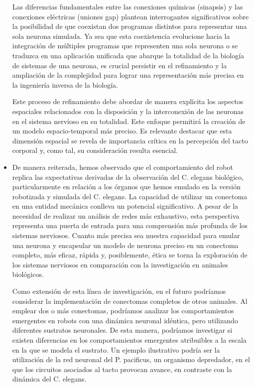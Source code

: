 \begin{itemize}
Las diferencias fundamentales entre las conexiones químicas (sinapsis) y las conexiones eléctricas (uniones gap) plantean interrogantes significativos sobre la posibilidad de que coexistan dos programas distintos para representar una sola neurona simulada. Ya sea que esta coexistencia evolucione hacia la integración de múltiples programas que representen una sola neurona o se traduzca en una aplicación unificada que abarque la totalidad de la biología de sistemas de una neurona, es crucial persistir en el refinamiento y la ampliación de la complejidad para lograr una representación más precisa en la ingeniería inversa de la biología.


Este proceso de refinamiento debe abordar de manera explícita los aspectos espaciales relacionados con la disposición y la interconexión de las neuronas en el sistema nervioso en su totalidad. Este enfoque permitirá la creación de un modelo espacio-temporal más preciso. Es relevante destacar que esta dimensión espacial se revela de importancia crítica en la percepción del tacto corporal y, como tal, su consideración resulta esencial.

\item De manera reiterada, hemos observado que el comportamiento del robot replica las expectativas derivadas de la observación del C. elegans biológico, particularmente en relación a los órganos que hemos emulado en la versión robotizada y simulada del C. elegans. La capacidad de utilizar un conectoma en una entidad mecánica conlleva un potencial significativo. A pesar de la necesidad de realizar un análisis de redes más exhaustivo, esta perspectiva representa una puerta de entrada para una comprensión más profunda de los sistemas nerviosos. Cuanto más precisa sea nuestra capacidad para emular una neurona y encapsular un modelo de neurona preciso en un conectoma completo, más eficaz, rápida y, posiblemente, ética se torna la exploración de los sistemas nerviosos en comparación con la investigación en animales biológicos.

Como extensión de esta línea de investigación, en el futuro podríamos considerar la implementación de conectomas completos de otros animales. Al emplear dos o más conectomas, podríamos analizar los comportamientos emergentes en robots con una dinámica neuronal idéntica, pero utilizando diferentes sustratos neuronales. De esta manera, podríamos investigar si existen diferencias en los comportamientos emergentes atribuibles a la escala en la que se modela el sustrato. Un ejemplo ilustrativo podría ser la utilización de la red neuronal del P. pacificus, un organismo depredador, en el que los circuitos asociados al tacto provocan avance, en contraste con la dinámica del C. elegans.


\end{itemize}
